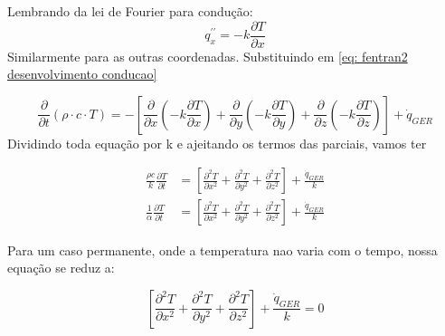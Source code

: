  Lembrando da lei de Fourier para condução:
 \begin{equation}
     q^{\prime \prime}_x=-k \frac{\partial T}{\partial x}
 \end{equation}
 Similarmente para as outras coordenadas. Substituindo  em \eqref{eq: fentran2 desenvolvimento conducao}

 \begin{equation}
     \frac{\partial}{\partial t}(\rho \cdot c \cdot T)=-[\frac{\partial}{\partial x}(-k \frac{\partial T}{\partial x})+ \frac{\partial}{\partial y}(-k \frac{\partial T}{\partial y})+ \frac{\partial}{\partial z}(-k \frac{\partial T}{\partial z})] + \dot{q}_{GER}
 \end{equation}
 Dividindo toda equação por k e ajeitando os termos das parciais, vamos ter

 \begin{align}
     \frac{\rho c}{k}\frac{\partial T}{\partial t}&= [\frac{\partial^2 T}{\partial x^2}+ \frac{\partial^2 T}{\partial y^2}+ \frac{\partial^2 T}{\partial z^2}]+\frac{\dot{q}_{GER}}{k} \\
     \label{eq: fentran2 equacao geral de conducao para paredes planas}
     \frac{1}{\alpha}\frac{\partial T}{\partial t}&= [\frac{\partial^2 T}{\partial x^2}+ \frac{\partial^2 T}{\partial y^2}+ \frac{\partial^2 T}{\partial z^2}]+\frac{\dot{q}_{GER}}{k}
 \end{align}

 Para um caso permanente, onde a temperatura nao varia com o tempo, nossa equação se reduz a:

 \begin{equation}\label{eq: fentran2 equacao conducao permanente}
     [\frac{\partial^2 T}{\partial x^2}+ \frac{\partial^2 T}{\partial y^2}+ \frac{\partial^2 T}{\partial z^2}]+\frac{\dot{q}_{GER}}{k}=0
 \end{equation}

